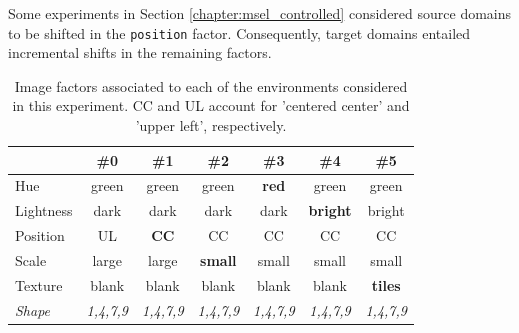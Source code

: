 \begin{dataset} Some experiments in Section \ref{chapter:msel_controlled}
    considered source domains to be shifted in the \texttt{position} factor. Consequently, target
    domains entailed incremental shifts in the remaining factors.

    \begin{table}[H]
        \centering
        \begin{tabular}{l|c|c|c|c|c|c}
         & \#0 & \#1 & \#2 & \#3 & \#4 & \#5 \\
        \midrule
        Hue & green & green & green & \textbf{red} & green & green \\
        Lightness & dark & dark & dark & dark & \textbf{bright} & bright \\
        Position  & UL & \textbf{CC} & CC & CC & CC & CC \\
        Scale  & large & large & \textbf{small} & small & small & small\\
        Texture & blank & blank & blank & blank & blank & \textbf{tiles} \\
        \textit{Shape} & \textit{1,4,7,9} &  \textit{1,4,7,9} &  \textit{1,4,7,9} & \textit{1,4,7,9} & \textit{1,4,7,9} & \textit{1,4,7,9}\\
        \bottomrule
        \end{tabular}
        \caption{
        Image factors associated to each of the environments considered in this experiment. CC and UL account
        for 'centered center' and 'upper left', respectively.
        }
        \label{ds:pos_test}
    \end{table}
\end{dataset}

